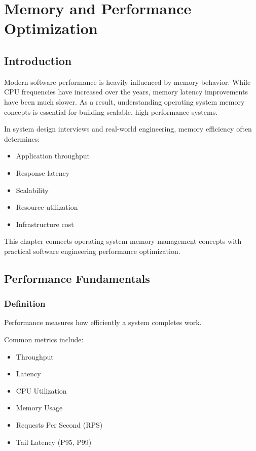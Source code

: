 \chapter{Memory and Performance Optimization}

\section{Introduction}

Modern software performance is heavily influenced by memory behavior. While CPU frequencies have increased over the years, memory latency improvements have been much slower. As a result, understanding operating system memory concepts is essential for building scalable, high-performance systems.

In system design interviews and real-world engineering, memory efficiency often determines:

\begin{itemize}
\item Application throughput
\item Response latency
\item Scalability
\item Resource utilization
\item Infrastructure cost
\end{itemize}

This chapter connects operating system memory management concepts with practical software engineering performance optimization.

\section{Performance Fundamentals}

\subsection{Definition}

Performance measures how efficiently a system completes work.

Common metrics include:

\begin{itemize}
\item Throughput
\item Latency
\item CPU Utilization
\item Memory Usage
\item Requests Per Second (RPS)
\item Tail Latency (P95, P99)
\end{itemize}

